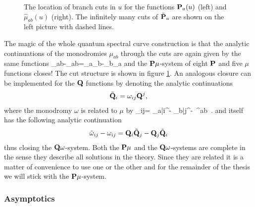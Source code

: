 \begin{figure}[t]
\caption[The location of branch cuts in $u$ for the functions $\bP_a(u)$ and $\hat{\mu}_{ab}(u)$]{The location of branch cuts in $u$ for the functions $\bP_a(u)$ (left) and $\hat{\mu}_{ab}(u)$ (right). The infinitely many cuts of $\tilde{{\bf P}}_a$ are shown on the left picture with dashed lines.}
\label{fig:pmu_cuts}
\end{figure}
The magic of the whole quantum spectral curve construction is that the analytic continuations of the monodromies $\mu_{ab}$ through the cuts are again given by the same functions \cite{Gromov:2014caa}
\beq
	\label{muPPt-eq}
	\tilde\mu_{ab}-\mu_{ab}=\bP_a\tilde \bP_b-\bP_b\tilde \bP_a\;
\eeq
and the ${\bf P}\mu$-system of eight ${\bf P}$ and five $\mu$ functions closes!
The cut structure is shown in figure \ref{fig:pmu_cuts}.
An analogous closure can be implemented for the ${\bf Q}$ functions by denoting the analytic continuations
\begin{equation}
\label{omegaQ}
\tilde {{\bf Q}}_i=\omega_{ij} {\bf Q}^j,
\end{equation}
where the monodromy $\omega$ is related to $\mu$ by
\beq
\label{muomega}
\omega_{ij}= _{a|i}^- _{b|j}^-\, \mu^{ab} \,.
\eeq
and itself has the following analytic continuation 
\begin{equation}\label{tQ=omegaQ}
\tilde\omega_{ij}-\omega_{ij}={\bf Q}_i\tilde{{\bf Q}}_j-{\bf Q}_j\tilde{{\bf Q}}_i
\end{equation}
thus closing the ${\bf Q}\omega$-system.
Both the ${\bf P}\mu$ and the ${\bf Q}\omega$-systems are complete in the sense they describe all solutions in the theory. 
Since they are related it is a matter of convenience to use one or the other and for the remainder of the thesis we will stick with the ${\bf P}\mu$-system.

\subsubsection{Asymptotics}

